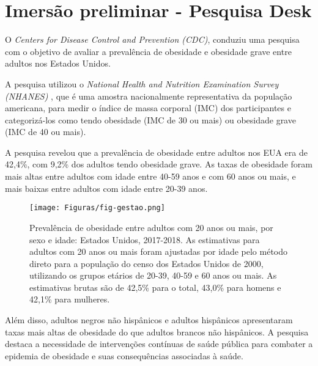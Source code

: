 \documentclass[
	12pt,				%
	oneside,   	        %
	a4paper,			%
	chapter=TITLE,		%
	section=TITLE,		%
	subsection=TITLE,	%
	subsubsection=TITLE,%
	english,			%
	french,				%
	spanish,			%
	brazil,				%
	]{pacotes/abntex2}
\begin{document}
\textual

\makeatletter
\renewcommand{\chapter}{\@gobbletwo}
\makeatother

\section{\textbf{Imersão preliminar - Pesquisa Desk}}
\label{sec:pesquisadesk}

O \textit{Centers for Disease Control and Prevention (CDC)}, conduziu uma pesquisa com o objetivo de avaliar a prevalência de obesidade e obesidade grave entre adultos nos Estados Unidos. 

A pesquisa utilizou o \textit{National Health and Nutrition Examination Survey (NHANES)} \cite{content}, que é uma amostra nacionalmente representativa da população americana, para medir o índice de massa corporal (IMC) dos participantes e categorizá-los como tendo obesidade (IMC de 30 ou mais) ou obesidade grave (IMC de 40 ou mais). 

A pesquisa revelou que a prevalência de obesidade entre adultos nos EUA era de 42,4\%, com 9,2\% dos adultos tendo obesidade grave. As taxas de obesidade foram mais altas entre adultos com idade entre 40-59 anos e com 60 anos ou mais, e mais baixas entre adultos com idade entre 20-39 anos.

\begin{figure}[H]
  \centering
  \texttt{[image: Figuras/fig-gestao.png]}
  \caption{Prevalência de obesidade entre adultos com 20 anos ou mais, por sexo e idade: Estados Unidos, 2017-2018. 
  As estimativas para adultos com 20 anos ou mais foram ajustadas por idade pelo método direto para a população do censo dos Estados Unidos de 2000, utilizando os grupos etários de 20-39, 40-59 e 60 anos ou mais. As estimativas brutas são de 42,5\% para o total, 43,0\% para homens e 42,1\% para mulheres.}
  \label{fig:tabela-prevalence}
\end{figure}

Além disso, adultos negros não hispânicos e adultos hispânicos apresentaram taxas mais altas de obesidade do que adultos brancos não hispânicos. A pesquisa destaca a necessidade de intervenções contínuas de saúde pública para combater a epidemia de obesidade e suas consequências associadas à saúde.
\end{document}
